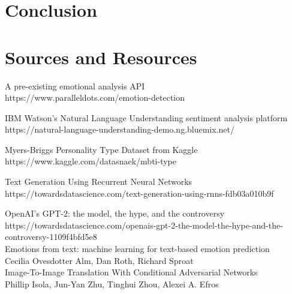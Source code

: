 \documentclass{article}
\begin{document}
\section{Conclusion}



\newpage
\section{Sources and Resources}
A pre-existing emotional analysis API \\
https://www.paralleldots.com/emotion-detection\newline
 
IBM Watson's Natural Language Understanding sentiment analysis platform\\
https://natural-language-understanding-demo.ng.bluemix.net/\newline
 
Myers-Briggs Personality Type Dataset from Kaggle\\
https://www.kaggle.com/datasnaek/mbti-type \newline

Text Generation Using Recurrent Neural Networks\\
https://towardsdatascience.com/text-generation-using-rnns-fdb03a010b9f \newline

OpenAI's GPT-2: the model, the hype, and the controversy
https://towardsdatascience.com/openais-gpt-2-the-model-the-hype-and-the-controversy-1109f4bfd5e8\\

Emotions from text: machine learning for text-based emotion prediction\\
Cecilia Ovesdotter Alm, Dan Roth, Richard Sproat\\

Image-To-Image Translation With Conditional Adversarial Networks\\
Phillip Isola, Jun-Yan Zhu, Tinghui Zhou, Alexei A. Efros\\
\end{document}
